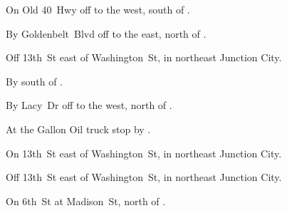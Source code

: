

\begin{LocationList}

On Old 40~Hwy off  to the west, south of .

By Goldenbelt~Blvd off   to the east, north of .

Off 13th~St east of  Washington~St, in northeast Junction City.

By  south of .

By Lacy~Dr off   to the west, north of .

At the Gallon Oil truck stop by  .

On 13th~St east of  Washington~St, in northeast Junction City.

Off 13th~St east of  Washington~St, in northeast Junction City.

On 6th~St at Madison~St, north of .

\end{LocationList}
